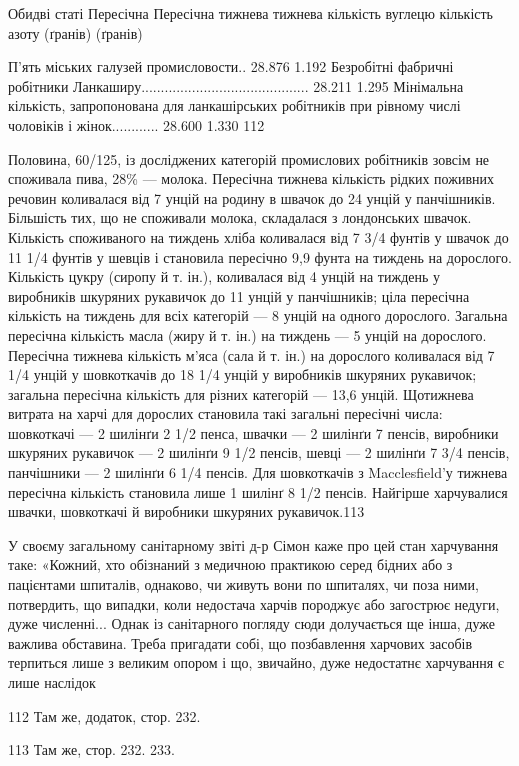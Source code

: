 Обидві статі                                                        Пересічна                       
       Пересічна
                                                                                тижнева             
                    тижнева
                                                                                кількість вуглецю   
            кількість азоту
                                                                                (ґранів)            
                      (ґранів)

П’ять міських галузей промисловости..     28.876                                      1.192
Безробітні фабричні робітники
Ланкаширу...........................................     28.211                                     
1.295
Мінімальна кількість, запропонована
для ланкашірських робітників при
рівному числі чоловіків і жінок............      28.600                                      1.330
112

Половина, 60/125, із досліджених категорій промислових робітників
зовсім не споживала пива, 28\% — молока. Пересічна
тижнева кількість рідких поживних речовин коливалася від
7 унцій на родину в швачок до 24 унцій у панчішників. Більшість
тих, що не споживали молока, складалася з лондонських
швачок. Кількість споживаного на тиждень хліба коливалася
від 7 3/4 фунтів у швачок до 11 1/4 фунтів у шевців і становила пересічно
9,9 фунта на тиждень на дорослого. Кількість цукру (сиропу
й т. ін.), коливалася від 4 унцій на тиждень у виробників
шкуряних рукавичок до 11 унцій у панчішників; ціла пересічна
кількість на тиждень для всіх категорій — 8 унцій на одного
дорослого. Загальна пересічна кількість масла (жиру й т. ін.)
на тиждень — 5 унцій на дорослого. Пересічна тижнева кількість
м’яса (сала й т. ін.) на дорослого коливалася від 7 1/4 унцій у шовкоткачів
до 18 1/4 унцій у виробників шкуряних рукавичок;
загальна пересічна кількість для різних категорій — 13,6 унцій.
Щотижнева витрата на харчі для дорослих становила такі загальні
пересічні числа: шовкоткачі — 2 шилінґи 2 1/2 пенса,
швачки — 2 шилінґи 7 пенсів, виробники шкуряних рукавичок
— 2 шилінґи 9 1/2 пенсів, шевці — 2 шилінґи 7 3/4 пенсів,
панчішники — 2 шилінґи 6 1/4 пенсів. Для шовкоткачів з Macclesfield’у
тижнева пересічна кількість становила лише 1 шилінґ
8 1/2 пенсів. Найгірше харчувалися швачки, шовкоткачі й виробники
шкуряних рукавичок.113

У своєму загальному санітарному звіті д-р Сімон каже про
цей стан харчування таке: «Кожний, хто обізнаний з медичною
практикою серед бідних або з пацієнтами шпиталів, однаково,
чи живуть вони по шпиталях, чи поза ними, потвердить, що випадки,
коли недостача харчів породжує або загострює недуги,
дуже численні... Однак із санітарного погляду сюди долучається
ще інша, дуже важлива обставина. Треба пригадати собі, що
позбавлення харчових засобів терпиться лише з великим опором
і що, звичайно, дуже недостатнє харчування є лише наслідок

112 Там же, додаток, стор. 232.

113 Там же, стор. 232. 233.
